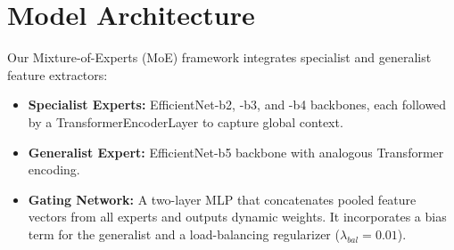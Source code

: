 \section{Model Architecture}
Our Mixture-of-Experts (MoE) framework integrates specialist and generalist feature extractors:
\begin{itemize}
\item \textbf{Specialist Experts:} EfficientNet-b2, -b3, and -b4 backbones, each followed by a TransformerEncoderLayer to capture global context.
\item \textbf{Generalist Expert:} EfficientNet-b5 backbone with analogous Transformer encoding.
\item \textbf{Gating Network:} A two-layer MLP that concatenates pooled feature vectors from all experts and outputs dynamic weights. It incorporates a bias term for the generalist and a load-balancing regularizer ($\lambda_{bal}=0.01$).
\end{itemize}

